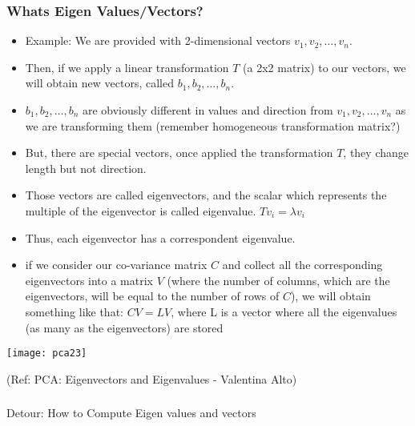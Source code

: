 \begin{frame}[fragile] \frametitle{Whats Eigen Values/Vectors?} 
\begin{itemize}
\item Example: We are provided with 2-dimensional vectors $v_1, v_2, \ldots, v_n$. 
\item Then, if we apply a linear transformation $T$ (a 2x2 matrix) to our vectors, we will obtain new vectors, called $b_1, b_2,\ldots,b_n$.
\item $b_1, b_2,\ldots,b_n$ are obviously different in values and direction from $v_1, v_2, \ldots, v_n$ as we are transforming them (remember homogeneous transformation matrix?)
\item But, there are special vectors, once applied the transformation $T$, they change length but not direction. 
\item Those vectors are called eigenvectors, and the scalar which represents the multiple of the eigenvector is called eigenvalue.
$Tv_i=\lambda v_i$
\item Thus, each eigenvector has a correspondent eigenvalue.
\item  if we consider our co-variance matrix $C$ and collect all the corresponding eigenvectors into a matrix $V$ (where the number of columns, which are the eigenvectors, will be equal to the number of rows of $C$), we will obtain something like that: $CV = LV$, where L is a vector where all the eigenvalues (as many as the eigenvectors) are stored
\end{itemize}

\begin{center}
\texttt{[image: pca23]}
\end{center}

{\tiny (Ref: PCA: Eigenvectors and Eigenvalues - Valentina Alto)}

\end{frame}

\begin{frame}[fragile]\frametitle{}
\begin{center}
{\Large Detour: How to Compute Eigen values and vectors}
\end{center}
\end{frame}


